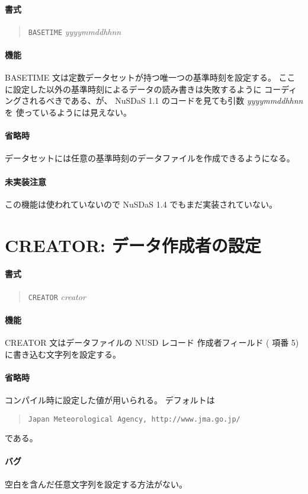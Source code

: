 \paragraph{書式}
\begin{quote}
{\tt BASETIME} {\it yyyymmddhhnn}
\end{quote}
\paragraph{機能}
BASETIME 文は定数データセットが持つ唯一つの基準時刻を設定する。
ここに設定した以外の基準時刻によるデータの読み書きは失敗するように
コーディングされるべきである、が、
NuSDaS 1.1 のコードを見ても引数 {\it yyyymmddhhnn} を
使っているようには見えない。
\paragraph{省略時}
データセットには任意の基準時刻のデータファイルを作成できるようになる。
\paragraph{未実装注意}
この機能は使われていないので NuSDaS 1.4 でもまだ実装されていない。

\section{CREATOR: データ作成者の設定}
\label{sec:def:CREATOR}
\paragraph{書式}
\begin{quote}
{\tt CREATOR} {\it creator}
\end{quote}
\paragraph{機能}
CREATOR 文はデータファイルの NUSD レコード
作成者フィールド
( 項番 5)
に書き込む文字列を設定する。
\paragraph{省略時}
コンパイル時に設定した値が用いられる。
デフォルトは
\begin{quote}
{\tt Japan Meteorological Agency, http://www.jma.go.jp/}
\end{quote}
である。
\paragraph{バグ}
空白を含んだ任意文字列を設定する方法がない。

